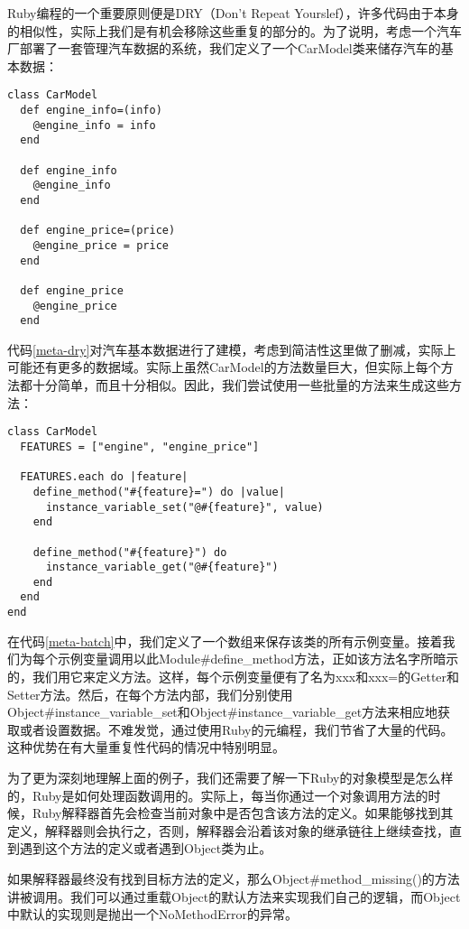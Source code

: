 Ruby编程的一个重要原则便是DRY（Don't Repeat Yourslef），许多代码由于本身的相似性，实际上我们是有机会移除这些重复的部分的。为了说明，考虑一个汽车厂部署了一套管理汽车数据的系统，我们定义了一个CarModel类来储存汽车的基本数据：

\begin{lstlisting}[caption={一个充斥着冗余代码的例子}, label=meta-dry]
class CarModel
  def engine_info=(info)
    @engine_info = info
  end

  def engine_info
    @engine_info
  end

  def engine_price=(price)
    @engine_price = price
  end

  def engine_price
    @engine_price
  end
\end{lstlisting}

代码\ref{meta-dry}对汽车基本数据进行了建模，考虑到简洁性这里做了删减，实际上可能还有更多的数据域。实际上虽然CarModel的方法数量巨大，但实际上每个方法都十分简单，而且十分相似。因此，我们尝试使用一些批量的方法来生成这些方法：

\begin{lstlisting}[caption={利用元编程批量生成Getter和Setter}, label=meta-batch]
class CarModel
  FEATURES = ["engine", "engine_price"]

  FEATURES.each do |feature|
    define_method("#{feature}=") do |value|
      instance_variable_set("@#{feature}", value)
    end

    define_method("#{feature}") do
      instance_variable_get("@#{feature}")
    end
  end
end
\end{lstlisting}

在代码\ref{meta-batch}中，我们定义了一个数组来保存该类的所有示例变量。接着我们为每个示例变量调用以此Module\#define\_method方法，正如该方法名字所暗示的，我们用它来定义方法。这样，每个示例变量便有了名为xxx和xxx=的Getter和Setter方法。然后，在每个方法内部，我们分别使用Object\#instance\_variable\_set和Object\#instance\_variable\_get方法来相应地获取或者设置数据。不难发觉，通过使用Ruby的元编程，我们节省了大量的代码。这种优势在有大量重复性代码的情况中特别明显。

为了更为深刻地理解上面的例子，我们还需要了解一下Ruby的对象模型是怎么样的，Ruby是如何处理函数调用的。实际上，每当你通过一个对象调用方法的时候，Ruby解释器首先会检查当前对象中是否包含该方法的定义。如果能够找到其定义，解释器则会执行之，否则，解释器会沿着该对象的继承链往上继续查找，直到遇到这个方法的定义或者遇到Object类为止。

如果解释器最终没有找到目标方法的定义，那么Object\#method\_missing()的方法讲被调用\supercite{ruby-pro}。我们可以通过重载Object的默认方法来实现我们自己的逻辑，而Object中默认的实现则是抛出一个NoMethodError的异常。

